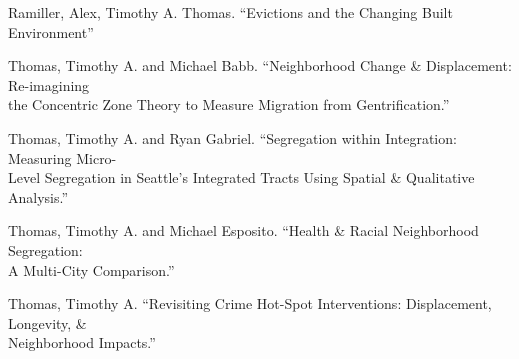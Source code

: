\begin{cventries}
{\begin{cvitems}
      \end{cvitems}        
      }
  \cventry
    { } %
{ } %
    { } %
    { } %
    {
      \begin{cvitems} %
Ramiller, Alex, Timothy A. Thomas. ``Evictions and the Changing Built Environment''\\
      \end{cvitems}    
      }
  \cventry
    { } %
{ } %
    { } %
    { } %
    {
      \begin{cvitems} %
Thomas, Timothy A. and Michael Babb. ``Neighborhood Change \& Displacement: Re-imagining\\
\hspace*{.25in}the Concentric Zone Theory to Measure Migration from Gentrification.''\\
      \end{cvitems}    
      }
  \cventry
    { } %
{ } %
    { } %
    { } %
    {
      \begin{cvitems} %
Thomas, Timothy A. and Ryan Gabriel. ``Segregation within Integration: Measuring Micro-\\
    \hspace*{.25in}Level Segregation in Seattle’s Integrated Tracts Using Spatial \& Qualitative Analysis.''\\
      \end{cvitems}        
      }
  \cventry
    { } %
{ } %
    { } %
    { } %
    {
      \begin{cvitems} %
Thomas, Timothy A. and Michael Esposito. ``Health \& Racial Neighborhood Segregation: \\
\hspace*{.25in}A Multi-City Comparison.''\\
      \end{cvitems}    
      }
  \cventry
    { } %
{ } %
    { } %
    { } %
    {
      \begin{cvitems} %
Thomas, Timothy A. ``Revisiting Crime Hot-Spot Interventions: Displacement, Longevity, \& \\
    \hspace*{.25in}Neighborhood Impacts.''\\
    \end{cvitems}    
      }


\end{cventries}
